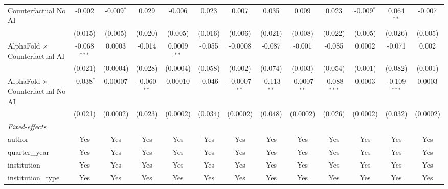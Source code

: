 \begin{tabular}{lcccccccccccc}
   Counterfactual No AI                     & -0.002         & -0.009$^{*}$ & 0.029         & -0.006        & 0.023        & 0.007          & 0.035         & 0.009          & 0.023          & -0.009$^{*}$  & 0.064$^{**}$   & -0.007\\   
                                            & (0.015)        & (0.005)      & (0.020)       & (0.005)       & (0.016)      & (0.006)        & (0.021)       & (0.008)        & (0.022)        & (0.005)       & (0.026)        & (0.005)\\   
   AlphaFold $\times$ Counterfactual AI     & -0.068$^{***}$ & 0.0003       & -0.014        & 0.0009$^{**}$ & -0.055       & -0.0008        & -0.087        & -0.001         & -0.085         & 0.0002        & -0.071         & 0.002\\   
                                            & (0.021)        & (0.0004)     & (0.028)       & (0.0004)      & (0.058)      & (0.002)        & (0.074)       & (0.003)        & (0.054)        & (0.001)       & (0.082)        & (0.001)\\   
   AlphaFold $\times$ Counterfactual No AI  & -0.038$^{*}$   & 0.00007      & -0.060$^{**}$ & 0.00010       & -0.046       & -0.0007$^{**}$ & -0.113$^{**}$ & -0.0007$^{**}$ & -0.088$^{***}$ & 0.0003        & -0.109$^{***}$ & 0.0003\\   
                                            & (0.021)        & (0.0002)     & (0.023)       & (0.0002)      & (0.034)      & (0.0002)       & (0.048)       & (0.0002)       & (0.026)        & (0.0002)      & (0.032)        & (0.0002)\\   
   \midrule
   \emph{Fixed-effects}\\
   author                                   & Yes            & Yes          & Yes           & Yes           & Yes          & Yes            & Yes           & Yes            & Yes            & Yes           & Yes            & Yes\\  
   quarter\_year                            & Yes            & Yes          & Yes           & Yes           & Yes          & Yes            & Yes           & Yes            & Yes            & Yes           & Yes            & Yes\\  
   institution                              & Yes            & Yes          & Yes           & Yes           & Yes          & Yes            & Yes           & Yes            & Yes            & Yes           & Yes            & Yes\\  
   institution\_type                        & Yes            & Yes          & Yes           & Yes           & Yes          & Yes            & Yes           & Yes            & Yes            & Yes           & Yes            & Yes\\  

\end{tabular}
